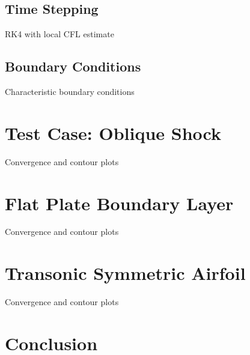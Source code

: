 \documentclass{article}
\begin{document}
\subsection{Time Stepping}
RK4 with local CFL estimate

\subsection{Boundary Conditions}
Characteristic boundary conditions

\section{Test Case: Oblique Shock}
Convergence and contour plots

\section{Flat Plate Boundary Layer}

Convergence and contour plots

\section{Transonic Symmetric Airfoil}
Convergence and contour plots

\section{Conclusion}
\end{document}
